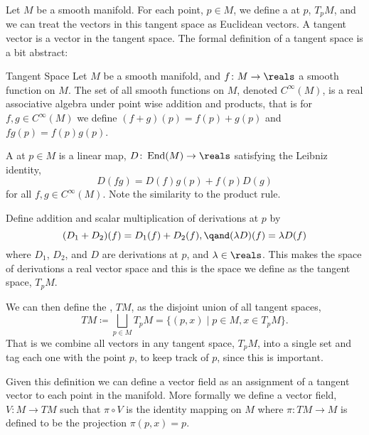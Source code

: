 Let \(M\) be a smooth manifold.
For each point, \(p \in M\), we define a  at \(p\), \(T_pM\), and we can treat the vectors in this tangent space as Euclidean vectors.
A tangent vector is a vector in the tangent space.
The formal definition of a tangent space is a bit abstract:
\begin{dfn}{Tangent Space}{}
    Let \(M\) be a smooth manifold, and \(f \colon M \to \reals\) a smooth function on \(M\).
    The set of all smooth functions on \(M\), denoted \(C^{\infty}(M)\), is a real associative algebra under point wise addition and products, that is for \(f, g \in C^{\infty}(M)\) we define \((f + g)(p) = f(p) + g(p)\) and \(fg(p) = f(p)g(p)\).
    
    A  at \(p \in M\) is a linear map, \(D \colon \End(M) \to \reals\) satisfying the Leibniz identity,
    \begin{equation}
        D(fg) = D(f)g(p) + f(p)D(g)
    \end{equation}
    for all \(f, g \in C^{\infty}(M)\).
    Note the similarity to the product rule.
    
    Define addition and scalar multiplication of derivations at \(p\) by
    \begin{equation}
        (D_1 + D_2)(f) = D_1(f) + D_2(f), \qand (\lambda D)(f) = \lambda D(f)
    \end{equation}
    where \(D_1\), \(D_2\), and \(D\) are derivations at \(p\), and \(\lambda \in \reals\).
    This makes the space of derivations a real vector space and this is the space we define as the tangent space, \(T_pM\).
    
    We can then define the , \(TM\), as the disjoint union of all tangent spaces,
    \begin{equation}
        TM \coloneqq \bigsqcup_{p \in M} T_pM = \{(p, x) \mid p \in M, x \in T_pM\}.
    \end{equation}
    That is we combine all vectors in any tangent space, \(T_pM\), into a single set and tag each one with the point \(p\), to keep track of \(p\), since this is important.
\end{dfn}

Given this definition we can define a vector field as an assignment of a tangent vector to each point in the manifold.
More formally we define a vector field, \(V \colon M \to TM\) such that \(\pi \circ V\) is the identity mapping on \(M\) where \(\pi \colon TM \to M\) is defined to be the projection \(\pi(p, x) = p\).
